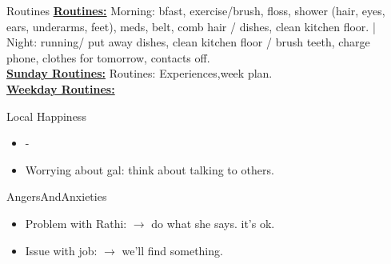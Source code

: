 \begin{columns}
\begin{column}{0.10\linewidth}
\end{column}
  \begin{column}{0.10\linewidth}
    \begin{block}{Routines}
      { \tiny \underline{\bf Routines:} Morning: bfast, exercise/brush,
        floss, shower (hair, eyes, ears, underarms, feet), meds, belt,
        comb hair / dishes, clean kitchen floor. |  Night: running/ put
        away dishes, clean kitchen floor / brush teeth, charge phone,
        clothes for tomorrow, contacts off.}\\
      {\tiny \underline{\bf Sunday Routines:} Routines:
        Experiences,week plan.}\\ 
      {\tiny \underline{\bf Weekday Routines:}}\\
    \end{block} 
    \begin{block}{Local Happiness}
      \begin{itemize} 
        \tiny \item \tiny -
      \item \tiny Worrying about gal: think about talking to others.
      \end{itemize} 
    \end{block}
    \begin{block}{AngersAndAnxieties}
      \begin{itemize}
      \item \tiny Problem with Rathi: $\rightarrow$ do what she
        says. it's ok. 

        \item \tiny Issue with job: $\rightarrow$ we'll find
          something.  


\end{itemize}
\end{block}
\end{column}
\end{columns}
